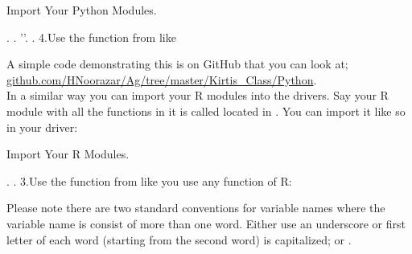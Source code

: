 \begin{tcolorbox}
  \begin{algorithm}[H]
  \label{alg:importPythonCode}
   \caption{Import Your Python Modules.}
.  . ''\code{)}.     .     \;
4.Use the function  from  like \\
\end{algorithm}
\end{tcolorbox}
A simple code demonstrating this is on GitHub that you can look at;
\href{https://github.com/HNoorazar/Ag/tree/master/Kirtis\_Class/Python}{github.com/HNoorazar/Ag/tree/master/Kirtis\_Class/Python}.\\

In a similar way you can import your R modules into the drivers.
Say your R module with all the functions in it is called 
located in .
You can import it like so in your driver:

\begin{tcolorbox}
  \begin{algorithm}[H]
  \label{alg:importRCode}
   \caption{Import Your R Modules.}
.   .  \;
3.Use the function  from  like you use any function of R: \\
\end{algorithm}
\end{tcolorbox}


\begin{rem}
Please note there are two standard conventions for 
variable names where the variable name is consist of
more than one word. Either use an underscore or first
letter of each word (starting from the second word) is capitalized;
 or .
\end{rem}








